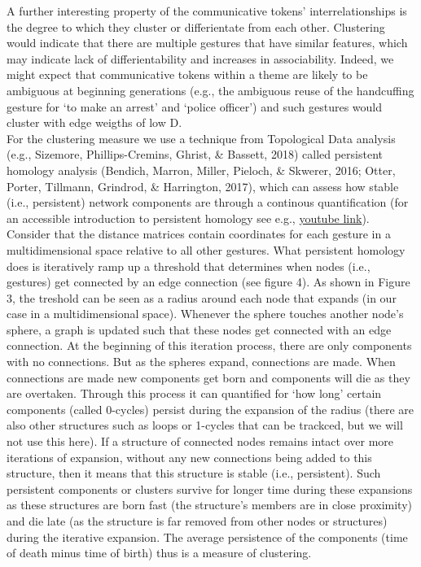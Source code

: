 \documentclass[
  man, noextraspace,floatsintext]{apa6}
\begin{document}
A further interesting property of the communicative tokens' interrelationships is the degree to which they cluster or differientate from each other. Clustering would indicate that there are multiple gestures that have similar features, which may indicate lack of differientability and increases in associability. Indeed, we might expect that communicative tokens within a theme are likely to be ambiguous at beginning generations (e.g., the ambiguous reuse of the handcuffing gesture for `to make an arrest' and `police officer') and such gestures would cluster with edge weigths of low D.\\
For the clustering measure we use a technique from Topological Data analysis (e.g., Sizemore, Phillips-Cremins, Ghrist, \& Bassett, 2018) called persistent homology analysis (Bendich, Marron, Miller, Pieloch, \& Skwerer, 2016; Otter, Porter, Tillmann, Grindrod, \& Harrington, 2017), which can assess how stable (i.e., persistent) network components are through a continous quantification (for an accessible introduction to persistent homology see e.g., \href{https://www.youtube.com/watch?v=E7d7LHb6PLc}{youtube link}).\\
Consider that the distance matrices contain coordinates for each gesture in a multidimensional space relative to all other gestures. What persistent homology does is iteratively ramp up a threshold that determines when nodes (i.e., gestures) get connected by an edge connection (see figure 4). As shown in Figure 3, the treshold can be seen as a radius around each node that expands (in our case in a multidimensional space). Whenever the sphere touches another node's sphere, a graph is updated such that these nodes get connected with an edge connection. At the beginning of this iteration process, there are only components with no connections. But as the spheres expand, connections are made. When connections are made new components get born and components will die as they are overtaken. Through this process it can quantified for `how long' certain components (called 0-cycles) persist during the expansion of the radius (there are also other structures such as loops or 1-cycles that can be trackced, but we will not use this here). If a structure of connected nodes remains intact over more iterations of expansion, without any new connections being added to this structure, then it means that this structure is stable (i.e., persistent). Such persistent components or clusters survive for longer time during these expansions as these structures are born fast (the structure's members are in close proximity) and die late (as the structure is far removed from other nodes or structures) during the iterative expansion. The average persistence of the components (time of death minus time of birth) thus is a measure of clustering.\\
\end{document}
